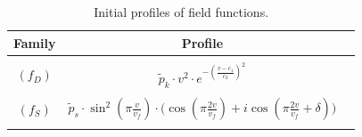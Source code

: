 \documentclass[aps,showpacs,nofootinbib,floatfix]{revtex4}
\newcommand{\tpe}{{\tilde p}}
\begin{document}
\begin{table}
\caption{Initial profiles of field functions.}
\begin{ruledtabular}
\begin{tabular}{c|cp{5cm}|}
Family & Profile\\
\hline
&\\
$\left(f_D\right)$ & $\tpe_k\cdot v^2\cdot e^{-\left(\frac{v-c_1}{c_2}\right)^2}$\\
&\\
$\left(f_S\right)$ & $\tpe_s\cdot \sin^2\left(\pi\frac{v}{v_f}\right)
\cdot\Bigg(\cos\left(\pi\frac{2v}{v_f}\right)+i\cos\left(\pi\frac{2v}{v_f}+\delta\right)\Bigg)$\\
&\\
\end{tabular}
\end{ruledtabular}
\label{tab:initial-profiles}
\end{table}


\end{document}
